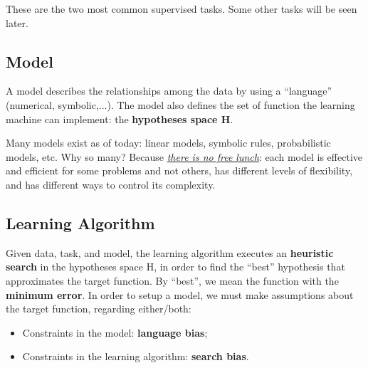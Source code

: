 These are the two most common supervised tasks. Some other tasks will be seen later.

\subsection{Model}

A model describes the relationships among the data by using a ``language'' (numerical, symbolic,...). The model also defines the set of function the learning machine can implement: the \textbf{hypotheses space H}. 

Many models exist as of today: linear models, symbolic rules, probabilistic models, etc. Why so many? Because \href{https://en.wikipedia.org/wiki/No_free_lunch_theorem}{\textit{there is no free lunch}}: each model is effective and efficient for some problems and not others, has different levels of flexibility, and has different ways to control its complexity.

\subsection{Learning Algorithm}

Given data, task, and model, the learning algorithm executes an \textbf{heuristic search} in the hypotheses space H, in order to find the ``best'' hypothesis that approximates the target function. By ``best'', we mean the function with the \textbf{minimum error}. In order to setup a model, we must make assumptions about the target function, regarding either/both:

\begin{itemize}
    \item Constraints in the model: \textbf{language bias};
    \item Constraints in the learning algorithm: \textbf{search bias}.
\end{itemize}

